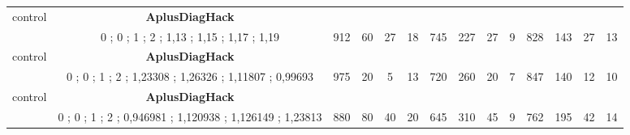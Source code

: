 \begin{table}[]
{\begin{tabular}{|c|c|c|c|c|c|c|c|c|c|c|c|c|c|}
control & \cellcolor{blue!15}\textbf{AplusDiagHack}& {\color[HTML]{00009B} } & {\color[HTML]{9A0000} } & {\color[HTML]{009901} } &  & {\color[HTML]{00009B} } & {\color[HTML]{9A0000} } & {\color[HTML]{009901} } &  & {\color[HTML]{00009B} } & {\color[HTML]{9A0000} } & {\color[HTML]{009901} } &  \\ 
 & \cellcolor{ blue!15}0 ; 0 ; 1 ; 2 ; 1,13 ; 1,15 ; 1,17 ; 1,19 & \multirow{-2}{*}{{\color[HTML]{00009B} 912}} & \multirow{-2}{*}{{\color[HTML]{9A0000} 60}} & \multirow{-2}{*}{{\color[HTML]{009901} 27}} & \multirow{-2}{*}{18} & \multirow{-2}{*}{{\color[HTML]{00009B} 745}} & \multirow{-2}{*}{{\color[HTML]{9A0000} 227}} & \multirow{-2}{*}{{\color[HTML]{009901} 27}} & \multirow{-2}{*}{9} & \multirow{-2}{*}{{\color[HTML]{00009B} 828}} & \multirow{-2}{*}{{\color[HTML]{9A0000} 143}} & \multirow{-2}{*}{{\color[HTML]{009901} 27}} & \multirow{-2}{*}{13} \\ \hline

control & \cellcolor{blue!15}\textbf{AplusDiagHack}& {\color[HTML]{00009B} } & {\color[HTML]{9A0000} } & {\color[HTML]{009901} } &  & {\color[HTML]{00009B} } & {\color[HTML]{9A0000} } & {\color[HTML]{009901} } &  & {\color[HTML]{00009B} } & {\color[HTML]{9A0000} } & {\color[HTML]{009901} } &  \\ 
 & \cellcolor{ blue!15}0 ; 0 ; 1 ; 2 ; 1,23308 ; 1,26326 ; 1,11807 ; 0,99693 & \multirow{-2}{*}{{\color[HTML]{00009B} 975}} & \multirow{-2}{*}{{\color[HTML]{9A0000} 20}} & \multirow{-2}{*}{{\color[HTML]{009901} 5}} & \multirow{-2}{*}{13} & \multirow{-2}{*}{{\color[HTML]{00009B} 720}} & \multirow{-2}{*}{{\color[HTML]{9A0000} 260}} & \multirow{-2}{*}{{\color[HTML]{009901} 20}} & \multirow{-2}{*}{7} & \multirow{-2}{*}{{\color[HTML]{00009B} 847}} & \multirow{-2}{*}{{\color[HTML]{9A0000} 140}} & \multirow{-2}{*}{{\color[HTML]{009901} 12}} & \multirow{-2}{*}{10} \\ \hline

control & \cellcolor{blue!15}\textbf{AplusDiagHack}& {\color[HTML]{00009B} } & {\color[HTML]{9A0000} } & {\color[HTML]{009901} } &  & {\color[HTML]{00009B} } & {\color[HTML]{9A0000} } & {\color[HTML]{009901} } &  & {\color[HTML]{00009B} } & {\color[HTML]{9A0000} } & {\color[HTML]{009901} } &  \\ 
 & \cellcolor{ blue!15}0 ; 0 ; 1 ; 2 ; 0,946981 ; 1,120938 ; 1,126149 ; 1,23813 & \multirow{-2}{*}{{\color[HTML]{00009B} 880}} & \multirow{-2}{*}{{\color[HTML]{9A0000} 80}} & \multirow{-2}{*}{{\color[HTML]{009901} 40}} & \multirow{-2}{*}{20} & \multirow{-2}{*}{{\color[HTML]{00009B} 645}} & \multirow{-2}{*}{{\color[HTML]{9A0000} 310}} & \multirow{-2}{*}{{\color[HTML]{009901} 45}} & \multirow{-2}{*}{9} & \multirow{-2}{*}{{\color[HTML]{00009B} 762}} & \multirow{-2}{*}{{\color[HTML]{9A0000} 195}} & \multirow{-2}{*}{{\color[HTML]{009901} 42}} & \multirow{-2}{*}{14} \\ \hline


\end{tabular}}
\end{table}
